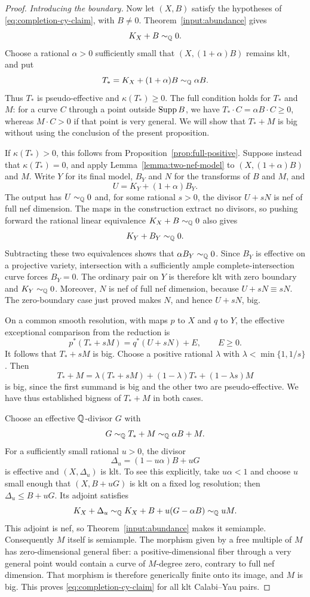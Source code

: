 \begin{proof}
\medskip
\noindent\emph{Introducing the boundary.}
Now let $(X,B)$ satisfy the hypotheses of
\eqref{eq:completion-cy-claim}, with $B\ne0$.
Theorem~\ref{input:abundance} gives
\[
  K_X+B\sim_{\mathbb Q}0.
\]
Choose a rational $\alpha>0$ sufficiently small that
$(X,(1+\alpha)B)$ remains klt, and put
\[
  T_*=K_X+(1+\alpha)B\sim_{\mathbb Q}\alpha B.
\]
Thus $T_*$ is pseudo-effective and $\kappa(T_*)\geq0$.  The full
condition holds for $T_*$ and $M$: for a curve $C$ through a point
outside $\operatorname{Supp} B$, we have $T_*\cdot C=\alpha B\cdot C\geq0$,
whereas $M\cdot C>0$ if that point is very general.
We will show that $T_*+M$ is big without using the conclusion
of the present proposition.

If $\kappa(T_*)>0$, this follows from
Proposition~\ref{prop:full-positive}.  Suppose instead that
$\kappa(T_*)=0$, and apply
Lemma~\ref{lemma:two-nef-model} to $(X,(1+\alpha)B)$ and $M$.
Write $Y$ for its final model, $B_Y$ and $N$ for the transforms of
$B$ and $M$, and
\[
  U=K_Y+(1+\alpha)B_Y.
\]
The output has $U\sim_{\mathbb Q}0$ and, for some rational $s>0$, the divisor
$U+sN$ is nef of full nef dimension.  The maps in the construction
extract no divisors, so pushing forward the rational linear equivalence
$K_X+B\sim_{\mathbb Q}0$ also gives
\[
  K_Y+B_Y\sim_{\mathbb Q}0.
\]
Subtracting these two equivalences shows that
$\alpha B_Y\sim_{\mathbb Q}0$.  Since $B_Y$ is effective on a projective
variety, intersection with a sufficiently ample complete-intersection
curve forces $B_Y=0$.  The ordinary pair on $Y$ is therefore klt with
zero boundary and $K_Y\sim_{\mathbb Q}0$.
Moreover, $N$ is nef of full nef dimension, because
$U+sN\equiv sN$.  The zero-boundary case just proved makes $N$, and
hence $U+sN$, big.

On a common smooth resolution, with maps $p$ to $X$ and $q$ to $Y$,
the effective exceptional comparison from the reduction is
\[
  p^*(T_*+sM)=q^*(U+sN)+E,
  \qquad E\geq0.
\]
It follows that $T_*+sM$ is big.  Choose a positive rational $\lambda$
with $\lambda<\min\{1,1/s\}$.  Then
\[
  T_*+M
   =\lambda(T_*+sM)+(1-\lambda)T_*+(1-\lambda s)M
\]
is big, since the first summand is big and the other two are
pseudo-effective.  We have thus established bigness of $T_*+M$ in
both cases.

Choose an effective $\mathbb Q$-divisor $G$ with
\[
  G\sim_{\mathbb Q}T_*+M\sim_{\mathbb Q}\alpha B+M.
\]
For a sufficiently small rational $u>0$, the divisor
\[
  \Delta_u=(1-u\alpha)B+uG
\]
is effective and $(X,\Delta_u)$ is klt.  To see this explicitly, take
$u\alpha<1$ and choose $u$ small enough that $(X,B+uG)$ is klt on a
fixed log resolution; then $\Delta_u\leq B+uG$.
Its adjoint satisfies
\[
  K_X+\Delta_u
   \sim_{\mathbb Q} K_X+B+u(G-\alpha B)
   \sim_{\mathbb Q}uM.
\]
This adjoint is nef, so Theorem~\ref{input:abundance} makes it
semiample.  Consequently $M$ itself is semiample.
The morphism given by a free multiple of $M$ has zero-dimensional
general fiber: a positive-dimensional fiber through a very general
point would contain a curve of $M$-degree zero, contrary to full nef
dimension.  That morphism is therefore generically finite onto its
image, and $M$ is big.  This proves
\eqref{eq:completion-cy-claim} for all klt Calabi--Yau pairs.


\end{proof}
